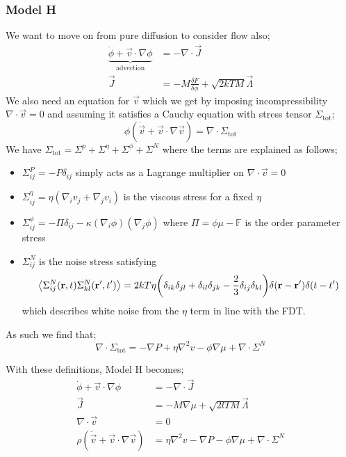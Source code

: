 \subsubsection{Model H}
We want to move on from pure diffusion to consider flow also;
\begin{align}
\underbrace{\dot{\phi} + \vec{v}\cdot \nabla \phi}_{\text{advection}} &= -\nabla \cdot \vec{J} \\
\vec{J} &= -M\frac{\delta F}{\delta \phi} + \sqrt{2kTM}\vec{\Lambda}
\end{align}
We also need an equation for $\vec{v}$ which we get by imposing incompressibility $\nabla\cdot\vec{v} = 0$ and assuming it satisfies a Cauchy equation with stress tensor $\Sigma_{\text{tot}}$;
\begin{equation}
\phi(\dot{\vec{v}} + \vec{v}\cdot\nabla \vec{v}) = \nabla \cdot \Sigma_{\text{tot}}
\end{equation}
We have $\Sigma_{\text{tot}} = \Sigma^{p} + \Sigma^{\eta} + \Sigma^{\phi} + \Sigma^{N}$ where the terms are explained as follows;
\begin{itemize}
\item $\Sigma^P_{ij} = -P\delta_{ij}$ simply acts as a Lagrange multiplier on $\nabla\cdot\vec{v} = 0$
\item $\Sigma^{\eta}_{ij} = \eta(\nabla_i v_j + \nabla_j v_i)$ is the viscous stress for a fixed $\eta$
\item $\Sigma^{\phi}_{ij} = -\Pi \delta_{ij} - \kappa (\nabla_i \phi)(\nabla_j \phi)$ where $\Pi = \phi \mu - \mathbb{F}$ is the order parameter stress
\item $\Sigma^{N}_{ij}$ is the noise stress satisfying
\begin{equation*}
\left< \Sigma_{ij}^{N}(\vec{r}, t)\Sigma_{kl}^{N}(\vec{r}\pr, t\pr) \right> = 2kT\eta \left(\delta_{ik}\delta_{jl} + \delta_{il}\delta_{jk}- \frac{2}{3}\delta_{ij}\delta_{kl}\right)\delta(\vec{r} - \vec{r}\pr) \delta(t - t\pr)
\end{equation*} 
which describes white noise from the $\eta$ term in line with the FDT. 
\end{itemize}
As such we find that;
\begin{equation}
\nabla \cdot \Sigma_{\text{tot}} = -\nabla P + \eta \nabla^2 v - \phi \nabla \mu + \nabla \cdot \Sigma^{N}
\end{equation}
\begin{definitionbox}[Model H]
With these definitions, Model H becomes;
\begin{align}
\dot{\phi} + \vec{v}\cdot\nabla \phi &= -\nabla \cdot \vec{J} \\
\vec{J} &= -M\nabla \mu + \sqrt{2lTM}\vec{\Lambda} \\
\nabla \cdot \vec{v} &= 0 \\
\rho(\dot{\vec{v}} + \vec{v}\cdot\nabla\vec{v}) &= \eta \nabla^2 v - \nabla P - \phi \nabla \mu + \nabla \cdot \Sigma^{N}
\end{align}
\end{definitionbox}

